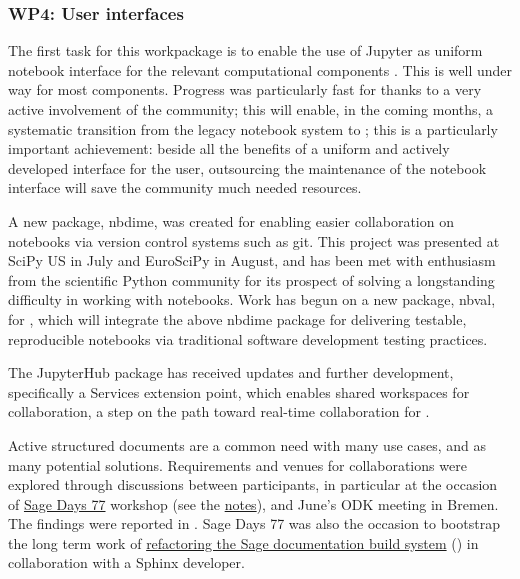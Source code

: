\documentclass{deliverablereport}
\begin{document}
\subsubsection{WP4: User interfaces}

The first task for this workpackage is to enable the use of Jupyter as
uniform notebook interface for the relevant computational components
. This is well under way for most
components. Progress was particularly fast for \Sage thanks to a
very active involvement of the community; this will enable, in the
coming months, a systematic transition from the legacy \Sage
notebook system to \Jupyter; this is a particularly important
achievement: beside all the benefits of a uniform and actively
developed interface for the user, outsourcing the maintenance of the
notebook interface will save the \Sage community much needed
resources.

A new \Jupyter package, nbdime, was created for 
enabling easier collaboration on notebooks via version control systems such as git.
This project was presented at SciPy US in July and EuroSciPy in August,
and has been met with enthusiasm from the scientific Python community
for its prospect of solving a longstanding difficulty in working with notebooks.
Work has begun on a new package, nbval, for ,
which will integrate the above nbdime package for delivering testable,
reproducible notebooks via traditional software development testing practices.

The JupyterHub package has received updates and further development,
specifically a Services extension point,
which enables shared workspaces for collaboration,
a step on the path toward real-time collaboration for .

Active structured documents are a common need with many use cases, and
as many potential solutions. Requirements and venues for
collaborations were explored through discussions between participants,
in particular at the occasion of
\href{https://wiki.sagemath.org/days77/}{Sage Days 77} workshop (see
the
\href{https://wiki.sagemath.org/days77/live-structured-documents}{notes}),
and June's ODK meeting in Bremen. The findings were reported in
. Sage Days 77 was also the occasion to bootstrap the long term work of
\href{https://wiki.sagemath.org/days77/documentation}{refactoring the
  Sage documentation build system} () in
collaboration with a Sphinx developer.
\end{document}
